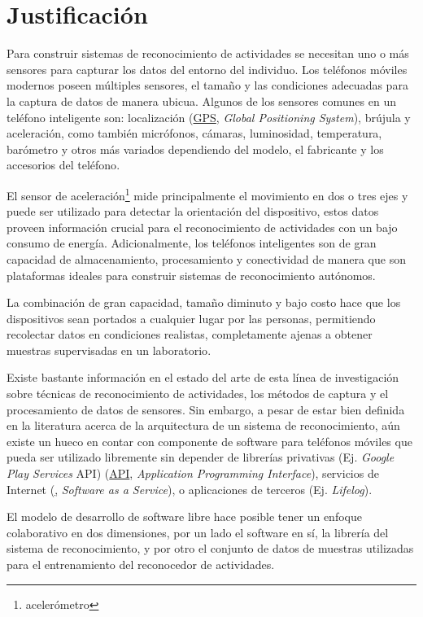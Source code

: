 \section{Justificación}

\label{justificaciuxf3n}

Para construir sistemas de reconocimiento de actividades se necesitan
uno o más sensores para capturar los datos del entorno del individuo.
Los teléfonos móviles modernos poseen múltiples sensores, el tamaño
y las condiciones adecuadas para la captura de datos de manera ubicua.
Algunos de los sensores comunes en un teléfono inteligente son: localización
(\hyperlink{abbr}{GPS}, \emph{Global Positioning System}), brújula
y aceleración, como también micrófonos, cámaras, luminosidad, temperatura,
barómetro y otros más variados dependiendo del modelo, el fabricante
y los accesorios del teléfono\cite{Kwapisz2011}.

El sensor de aceleración\footnote{acelerómetro} mide principalmente
el movimiento en dos o tres ejes y puede ser utilizado para detectar
la orientación del dispositivo, estos datos proveen información crucial
para el reconocimiento de actividades con un bajo consumo de energía.
Adicionalmente, los teléfonos inteligentes son de gran capacidad de
almacenamiento, procesamiento y conectividad de manera que son plataformas
ideales para construir sistemas de reconocimiento autónomos.

La combinación de gran capacidad, tamaño diminuto y bajo costo hace
que los dispositivos sean portados a cualquier lugar por las personas,
permitiendo recolectar datos en condiciones realistas, completamente
ajenas a obtener muestras supervisadas en un laboratorio\cite{Bao2004}. 

Existe bastante información en el estado del arte de esta línea de
investigación sobre técnicas de reconocimiento de actividades, los
métodos de captura y el procesamiento de datos de sensores\cite{LaraLabrador2012}\cite{Kwapisz2011}.
Sin embargo, a pesar de estar bien definida en la literatura acerca
de la arquitectura de un sistema de reconocimiento, aún existe un
hueco en contar con componente de software para teléfonos móviles
que pueda ser utilizado libremente sin depender de librerías privativas
(Ej. \emph{Google Play Services} API) (\hyperlink{abbr}{API}, \emph{Application
Programming Interface}), servicios de Internet (\hyperlink{SaaS},
\emph{Software as a Service}), o aplicaciones de terceros (Ej. \emph{Lifelog}).

El modelo de desarrollo de software libre hace posible tener un enfoque
colaborativo en dos dimensiones, por un lado el software en sí, la
librería del sistema de reconocimiento, y por otro el conjunto de
datos de muestras utilizadas para el entrenamiento del reconocedor
de actividades.

